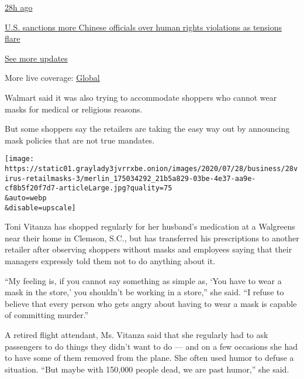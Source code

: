 \href{https://www.nytimes3xbfgragh.onion/live/2020/07/31/business/stock-market-today-coronavirus?action=click\&pgtype=Article\&state=default\&region=MAIN_CONTENT_1\&context=storylines_live_updates\#us-sanctions-more-chinese-officials-over-human-rights-violations-as-tensions-flare}{28h
ago}

\href{https://www.nytimes3xbfgragh.onion/live/2020/07/31/business/stock-market-today-coronavirus?action=click\&pgtype=Article\&state=default\&region=MAIN_CONTENT_1\&context=storylines_live_updates\#us-sanctions-more-chinese-officials-over-human-rights-violations-as-tensions-flare}{U.S.
sanctions more Chinese officials over human rights violations as
tensions flare}

\href{https://www.nytimes3xbfgragh.onion/live/2020/07/31/business/stock-market-today-coronavirus?action=click\&pgtype=Article\&state=default\&region=MAIN_CONTENT_1\&context=storylines_live_updates}{See
more updates}

More live coverage:
\href{https://www.nytimes3xbfgragh.onion/2020/08/01/world/coronavirus-covid-19.html?action=click\&pgtype=Article\&state=default\&region=MAIN_CONTENT_1\&context=storylines_live_updates}{Global}

Walmart said it was also trying to accommodate shoppers who cannot wear
masks for medical or religious reasons.

But some shoppers say the retailers are taking the easy way out by
announcing mask policies that are not true mandates.

\texttt{[image: https://static01.graylady3jvrrxbe.onion/images/2020/07/28/business/28virus-retailmasks-3/merlin\_175034292\_21b5a829-03be-4e37-aa9e-cf8b5f20f7d7-articleLarge.jpg?quality=75\\\&auto=webp\\\&disable=upscale]}

Toni Vitanza has shopped regularly for her husband's medication at a
Walgreens near their home in Clemson, S.C., but has transferred his
prescriptions to another retailer after observing shoppers without masks
and employees saying that their managers expressly told them not to do
anything about it.

``My feeling is, if you cannot say something as simple as, `You have to
wear a mask in the store,' you shouldn't be working in a store,'' she
said. ``I refuse to believe that every person who gets angry about
having to wear a mask is capable of committing murder.''

A retired flight attendant, Ms. Vitanza said that she regularly had to
ask passengers to do things they didn't want to do --- and on a few
occasions she had to have some of them removed from the plane. She often
used humor to defuse a situation. ``But maybe with 150,000 people dead,
we are past humor,'' she said.

